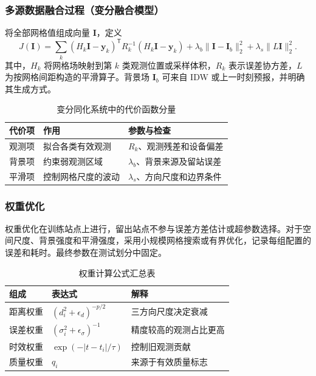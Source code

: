 \subsubsection{多源数据融合过程（变分融合模型）}
将全部网格值组成向量 $\bm I$，定义
\begin{equation}\label{eq:variational}
J(\bm I)=\sum_k(H_k\bm I-\bm y_k)^\mathsf TR_k^{-1}(H_k\bm I-\bm y_k)
+\lambda_b\|\bm I-\bm I_b\|_2^2+\lambda_s\|L\bm I\|_2^2.
\end{equation}
其中，$H_k$ 将网格场映射到第 $k$ 类观测位置或采样体积，$R_k$ 表示误差协方差，$L$ 为按网格间距构造的平滑算子。背景场 $\bm I_b$ 可来自 IDW 或上一时刻预报，并明确其生成方式。
\begin{table}[H]\centering\caption{变分同化系统中的代价函数分量}
\begin{tabularx}{\linewidth}{lYY}\toprule
代价项 & 作用 & 参数与检查\\\midrule
观测项 & 拟合各类有效观测 & $R_k$、观测残差和设备偏差\\
背景项 & 约束弱观测区域 & $\lambda_b$、背景来源及留站误差\\
平滑项 & 控制网格尺度的波动 & $\lambda_s$、方向尺度和边界条件\\\bottomrule
\end{tabularx}\end{table}
\subsubsection{权重优化}
权重优化在训练站点上进行，留出站点不参与误差方差估计或超参数选择。对于空间尺度、背景强度和平滑强度，采用小规模网格搜索或有界优化，记录每组配置的误差和耗时。最终参数在测试划分中固定。
\begin{table}[H]\centering\caption{权重计算公式汇总表}
\begin{tabularx}{\linewidth}{lYY}\toprule
组成 & 表达式 & 解释\\\midrule
距离权重 & $(d_i^2+\epsilon_d)^{-p/2}$ & 三方向尺度决定衰减\\
误差权重 & $(\sigma_i^2+\epsilon_\sigma)^{-1}$ & 精度较高的观测占比更高\\
时效权重 & $\exp(-|t-t_i|/\tau)$ & 控制旧观测贡献\\
质量权重 & $q_i$ & 来源于有效质量标志\\\bottomrule
\end{tabularx}\end{table}
